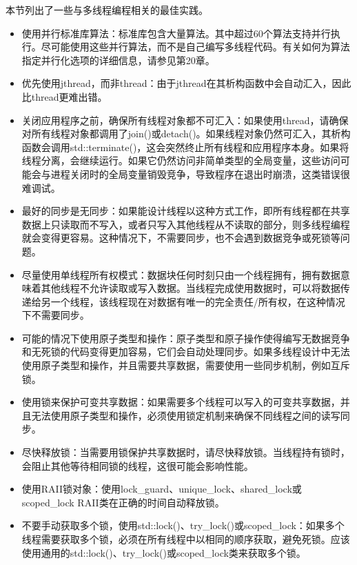 本节列出了一些与多线程编程相关的最佳实践。

\begin{itemize}
\item
使用并行标准库算法：标准库包含大量算法。其中超过60个算法支持并行执行。尽可能使用这些并行算法，而不是自己编写多线程代码。有关如何为算法指定并行化选项的详细信息，请参见第20章。

\item
优先使用jthread，而非thread：由于jthread在其析构函数中会自动汇入，因此比thread更难出错。

\item
关闭应用程序之前，确保所有线程对象都不可汇入：如果使用thread，请确保对所有线程对象都调用了join()或detach()。如果线程对象仍然可汇入，其析构函数会调用std::terminate()，这会突然终止所有线程和应用程序本身。如果将线程分离，会继续运行。如果它仍然访问非简单类型的全局变量，这些访问可能会与进程关闭时的全局变量销毁竞争，导致程序在退出时崩溃，这类错误很难调试。

\item
最好的同步是无同步：如果能设计线程以这种方式工作，即所有线程都在共享数据上只读取而不写入，或者只写入其他线程从不读取的部分，则多线程编程就会变得更容易。这种情况下，不需要同步，也不会遇到数据竞争或死锁等问题。

\item
尽量使用单线程所有权模式：数据块任何时刻只由一个线程拥有，拥有数据意味着其他线程不允许读取或写入数据。当线程完成使用数据时，可以将数据传递给另一个线程，该线程现在对数据有唯一的完全责任/所有权，在这种情况下不需要同步。

\item
可能的情况下使用原子类型和操作：原子类型和原子操作使得编写无数据竞争和无死锁的代码变得更加容易，它们会自动处理同步。如果多线程设计中无法使用原子类型和操作，并且需要共享数据，需要使用一些同步机制，例如互斥锁。

\item
使用锁来保护可变共享数据：如果需要多个线程可以写入的可变共享数据，并且无法使用原子类型和操作，必须使用锁定机制来确保不同线程之间的读写同步。

\item
尽快释放锁：当需要用锁保护共享数据时，请尽快释放锁。当线程持有锁时，会阻止其他等待相同锁的线程，这很可能会影响性能。

\item
使用RAII锁对象：使用lock\_guard、unique\_lock、shared\_lock或scoped\_lock RAII类在正确的时间自动释放锁。

\item
不要手动获取多个锁，使用std::lock()、try\_lock()或scoped\_lock：如果多个线程需要获取多个锁，必须在所有线程中以相同的顺序获取，避免死锁。应该使用通用的std::lock()、try\_lock()或scoped\_lock类来获取多个锁。


\end{itemize}
